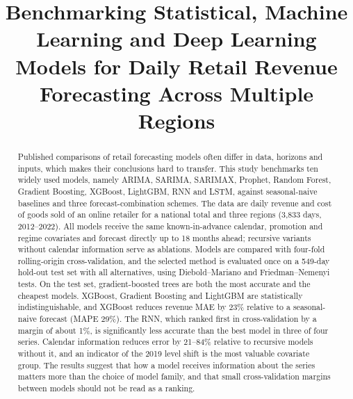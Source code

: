 \documentclass[conference]{IEEEtran}
\begin{document}
\title{Benchmarking Statistical, Machine Learning and Deep Learning Models for Daily Retail Revenue Forecasting Across Multiple Regions}
\author{}
\maketitle

\begin{abstract}
Published comparisons of retail forecasting models often differ in data, horizons and inputs, which makes their conclusions hard to transfer.
This study benchmarks ten widely used models, namely ARIMA, SARIMA, SARIMAX, Prophet, Random Forest, Gradient Boosting, XGBoost, LightGBM, RNN and LSTM, against seasonal-naive baselines and three forecast-combination schemes.
The data are daily revenue and cost of goods sold of an online retailer for a national total and three regions (3{,}833 days, 2012--2022).
All models receive the same known-in-advance calendar, promotion and regime covariates and forecast directly up to 18 months ahead; recursive variants without calendar information serve as ablations.
Models are compared with four-fold rolling-origin cross-validation, and the selected method is evaluated once on a 549-day hold-out test set with all alternatives, using Diebold--Mariano and Friedman--Nemenyi tests.
On the test set, gradient-boosted trees are both the most accurate and the cheapest models.
XGBoost, Gradient Boosting and LightGBM are statistically indistinguishable, and XGBoost reduces revenue MAE by 23\% relative to a seasonal-naive forecast (MAPE 29\%).
The RNN, which ranked first in cross-validation by a margin of about 1\%, is significantly less accurate than the best model in three of four series.
Calendar information reduces error by 21--84\% relative to recursive models without it, and an indicator of the 2019 level shift is the most valuable covariate group.
The results suggest that how a model receives information about the series matters more than the choice of model family, and that small cross-validation margins between models should not be read as a ranking.
\end{abstract}
\end{document}
